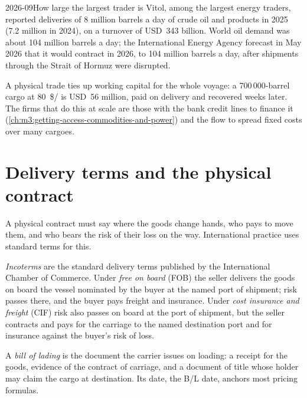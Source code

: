 \begin{dated}{2026-09}{How large the largest trader is}\label{dat:m3:physical-commodity-markets:scale}
Vitol, among the largest energy traders, reported deliveries of 8 million barrels a day
of crude oil and products in 2025 (7.2 million in 2024), on a turnover of USD~343
billion. World oil demand was about 104 million barrels a day; the International
Energy Agency forecast in May 2026 that it would contract in 2026, to 104 million
barrels a day, after shipments through the Strait of Hormuz were disrupted.
\end{dated}

\begin{remark}\label{rem:m3:physical-commodity-markets:scale}
A physical trade ties up working capital for the whole voyage: a
700\,000-barrel cargo at \qty{80}{\$/\barrel} is USD~56 million, paid on
delivery and recovered weeks later. The firms that do this at scale are those
with the bank credit lines to finance it (\cref{ch:m3:getting-access-commodities-and-power})
and the flow to spread fixed costs over many cargoes.
\end{remark}

\section{Delivery terms and the physical contract}

A physical contract must say where the goods change hands, who pays to move
them, and who bears the risk of their loss on the way. International practice
uses standard terms for this.

\begin{definition}\label{def:m3:physical-commodity-markets:incoterms}
\emph{Incoterms} are the standard delivery terms published by the
International Chamber of Commerce. Under \emph{free on board}
(FOB) the seller delivers the goods on board the vessel nominated by the buyer at
the named port of shipment; risk passes there, and the buyer pays freight and
insurance. Under \emph{cost insurance and freight}
(CIF) risk also passes on board at the port of shipment, but the seller contracts
and pays for the carriage to the named destination port and for insurance against
the buyer's risk of loss.
\end{definition}

\begin{definition}\label{def:m3:physical-commodity-markets:bl}
A \emph{bill of lading} is the document the carrier issues
on loading: a receipt for the goods, evidence of the contract of carriage, and a
document of title whose holder may claim the cargo at destination. Its date, the
B/L date, anchors most pricing formulas.
\end{definition}

